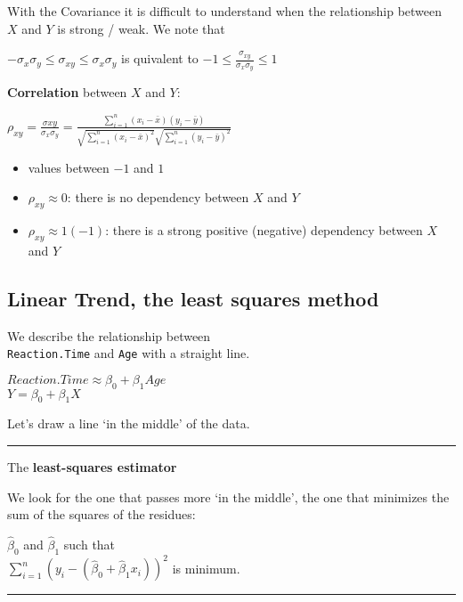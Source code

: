 \documentclass[]{article}
\providecommand{\tightlist}{%
  \setlength{\itemsep}{0pt}\setlength{\parskip}{0pt}}
\begin{document}
With the Covariance it is difficult to understand when the relationship
between \(X\) and \(Y\) is strong / weak. We note that

\(- \sigma_{x} \sigma_{y} \leq \sigma_{xy} \leq \sigma_{x} \sigma_{y}\)
is quivalent to
\(-1 \leq \frac{\sigma_{xy}}{\sigma_{x} \sigma_{y}} \leq 1\)

\textbf{Correlation} between \(X\) and \(Y\):

\(\rho_{xy}=\frac{\sigma{xy}}{\sigma_{x} \sigma_{y}} = \frac{\sum_{i=1} ^ n (x_i- \bar{x}) (y_i- \bar{y})}{\sqrt{\sum_{i=1} ^ n (x_i- \bar{ x}) ^ 2} \sqrt{\sum_{i=1} ^ n (y_i- \bar{y}) ^ 2}}\)

\begin{itemize}
\tightlist
\item
  values between \(-1\) and \(1\)
\item
  \(\rho_{xy} \approx 0\): there is no dependency between \(X\) and
  \(Y\)
\item
  \(\rho_{xy} \approx 1 (-1)\): there is a strong positive (negative)
  dependency between \(X\) and \(Y\)
\end{itemize}

\subsection{Linear Trend, the least squares
method}\label{linear-trend-the-least-squares-method}

We describe the relationship between\\
\texttt{Reaction.Time} and \texttt{Age} with a straight line.

\(Reaction.Time \approx \beta_0 + \beta_1 Age\)\\
\(Y=\beta_0 + \beta_1X\)

Let's draw a line `in the middle' of the data.

\begin{center}\rule{0.5\linewidth}{\linethickness}\end{center}

The \textbf{least-squares estimator}

We look for the one that passes more `in the middle', the one that
minimizes the sum of the squares of the residues:

\(\hat{\beta}_0\) and \(\hat{\beta}_1\) such that\\
\(\sum_{i=1} ^ n (y_i - (\hat{\beta}_0 + \hat{\beta}_1x_i )) ^ 2\) is
minimum.

\begin{center}\rule{0.5\linewidth}{\linethickness}\end{center}
\end{document}
